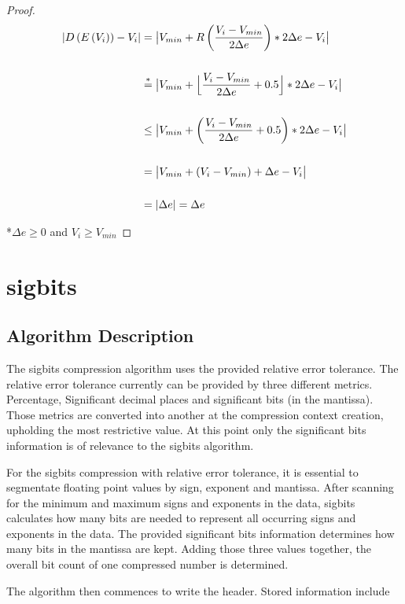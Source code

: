 \documentclass[
	12pt,
	a4paper,
	BCOR10mm,
	DIV14,
	headsepline,
]{scrreprt}
\DeclarePairedDelimiter{\floor}{\lfloor}{\rfloor}
\DeclarePairedDelimiter{\abs}{\lvert}{\rvert}
\begin{document}
\begin{proof}
	\begin{align*}
	  \lvert D\left(E\left(V_i\right)\right) - V_i\rvert
	  &=\abs[\big]{V_{min} + R\left(\frac{V_i - V_{min}}{2\Delta{e}}\right) * 2\Delta{e} - V_i} \\
	  &\\
	  &\stackrel{*}{=}\abs[\big]{V_{min} + \floor[\Big]{\frac{V_i - V_{min}}{2\Delta{e}} + 0.5} * 2\Delta{e} - V_i} \\
	  &\\
	  &\le\abs[\big]{V_{min} + \left(\frac{V_i - V_{min}}{2\Delta{e}} + 0.5\right) * 2\Delta{e} - V_i} \\
	  &\\
	  &=\abs[\big]{V_{min} + \left(V_i - V_{min}\right) + \Delta{e} - V_i} \\
	  &\\
	  &=\abs{\Delta{e}} = \Delta{e} \qedhere
	\end{align*}

	\vfill

	\scriptsize{*$\Delta{e}\ge 0$ and $V_i\ge V_{min}$}

\end{proof}

\chapter{sigbits}
\label{sigbits}

\section{Algorithm Description}

\bigskip

The sigbits compression algorithm uses the provided relative error tolerance.
The relative error tolerance currently can be provided by three different
metrics. Percentage, Significant decimal places and significant bits (in the
mantissa). Those metrics are converted into another at the compression context
creation, upholding the most restrictive value. At this point only the
significant bits information is of relevance to the sigbits algorithm. \par
For the sigbits compression with relative error tolerance, it is essential to
segmentate floating point values by sign, exponent and mantissa. After scanning
for the minimum and maximum signs and exponents in the data, sigbits calculates
how many bits are needed to represent all occurring signs and exponents in the
data. The provided significant bits information determines how many bits in the
mantissa are kept. Adding those three values together, the overall bit count of
one compressed number is determined.\par
The algorithm then commences to write the header. Stored information include
\end{document}

